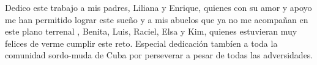\begin{dedication}
    Dedico este trabajo a mis padres, Liliana y Enrique, quienes con su amor y apoyo me han permitido lograr este sueño y a mis abuelos que ya no me acompañan en este plano terrenal , Benita, Luis, Raciel, Elsa y Kim, quienes estuvieran muy felices de verme cumplir este reto.
    Especial dedicación tambíen a toda la comunidad sordo-muda de Cuba por perseverar a pesar de todas las adversidades.
    
\end{dedication}